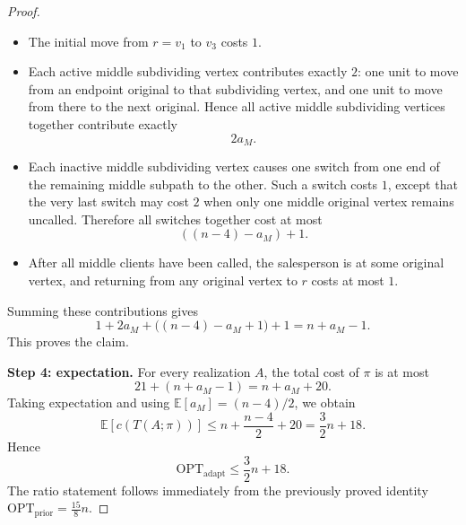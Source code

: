 \documentclass[11pt]{amsart}
\newcommand{\E}{\mathbb{E}}
\newcommand{\optprior}{\mathrm{OPT}_{\mathrm{prior}}}
\newcommand{\optadapt}{\mathrm{OPT}_{\mathrm{adapt}}}
\begin{document}
\begin{proof}
\begin{itemize}
    \item The initial move from $r=v_1$ to $v_3$ costs $1$.
    \item Each active middle subdividing vertex contributes exactly $2$: one unit to move from an endpoint original to that subdividing vertex, and one unit to move from there to the next original. Hence all active middle subdividing vertices together contribute exactly
    \[
    2a_M.
    \]
    \item Each inactive middle subdividing vertex causes one switch from one end of the remaining middle subpath to the other. Such a switch costs $1$, except that the very last switch may cost $2$ when only one middle original vertex remains uncalled. Therefore all switches together cost at most
    \[
    ((n-4)-a_M)+1.
    \]
    \item After all middle clients have been called, the salesperson is at some original vertex, and returning from any original vertex to $r$ costs at most $1$.
\end{itemize}

Summing these contributions gives
\[
1+2a_M+\bigl((n-4)-a_M+1\bigr)+1=n+a_M-1.
\]
This proves the claim.

\medskip
\noindent\textbf{Step 4: expectation.}
For every realization $A$, the total cost of $\pi$ is at most
\[
21+(n+a_M-1)=n+a_M+20.
\]
Taking expectation and using $\E[a_M]=(n-4)/2$, we obtain
\[
\E[c(T(A;\pi))]
\le n+\frac{n-4}{2}+20
=\frac32 n+18.
\]
Hence
\[
\optadapt\le \frac32 n+18.
\]
The ratio statement follows immediately from the previously proved identity $\optprior=\frac{15}{8}n$.
\end{proof}
\end{document}
